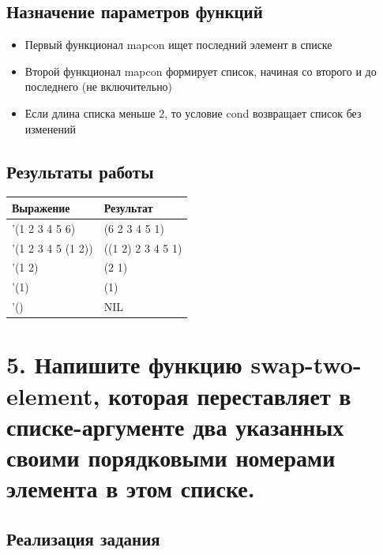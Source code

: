\documentclass[a4paper,12pt]{article}
\begin{document}
	\subsection*{Назначение параметров функций}
	
	\begin{itemize}
		\item Первый функционал mapcon ищет последний элемент в списке
		\item Второй функционал mapcon формирует список, начиная со второго и до последнего (не включительно)
		\item Если длина списка меньше 2, то условие cond возвращает список без изменений
	\end{itemize}
	
	\subsection*{Результаты работы}
	
	\begin{table} [h!]
		\begin{center}
			\begin{tabular}{|l|l|}
				\hline
				{\bf  Выражение} &    {\bf Результат} \\
				\hline
				{'(1 2 3 4 5 6)} & (6 2 3 4 5 1)\\
				\hline
				{'(1 2 3 4 5 (1 2))} & ((1 2) 2 3 4 5 1)\\
				\hline
				{'(1 2)} & (2 1)\\
				\hline
				{'(1)} & (1)\\
				\hline
				{'()} & NIL\\
				\hline
			\end{tabular}  
			\label{m2}
		\end{center}
	\end{table}
	
	 \newpage
	
	\section*{5. Напишите функцию swap-two-element, которая переставляет в списке-аргументе два указанных своими порядковыми номерами элемента в этом списке.}
	
	\subsection*{Реализация задания}
	
\end{document}
